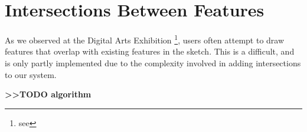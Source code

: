 \section{Intersections Between
Features}\label{intersections-between-features}

As we observed at the Digital Arts Exhibition \footnote{see}, users
often attempt to draw features that overlap with existing features in
the sketch. This is a difficult, and is only partly implemented due to
the complexity involved in adding intersections to our system.

\textbf{\textgreater{}\textgreater{}TODO algorithm}
